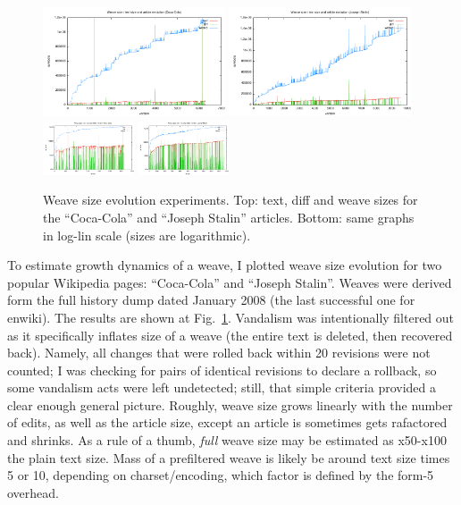 \documentclass{acm_proc_article-sp}
\begin{document}
\begin{figure} \label{fig:weave}
\includegraphics[width=0.48\textwidth]{cocacola-weave_vs_text-linscale.pdf}
\includegraphics[width=0.48\textwidth]{stalin-weave_vs_text-linscale.pdf}
\includegraphics[width=0.24\textwidth]{cocacola-weave_vs_text-logscale.pdf}
\includegraphics[width=0.24\textwidth]{stalin-weave_vs_text-logscale.pdf}
\caption{Weave size evolution experiments. Top: text, diff and weave sizes for the ``Coca-Cola'' and ``Joseph Stalin'' articles. Bottom: same graphs in log-lin scale (sizes are logarithmic).}
\end{figure}
To estimate growth dynamics of a weave, I plotted
weave size evolution for two popular Wikipedia pages: ``Coca-Cola''
and ``Joseph Stalin''. Weaves were derived form the full
history dump dated January 2008 (the last successful one
for enwiki). The results are shown at Fig.~\ref{fig:weave}.
Vandalism was intentionally filtered out as it specifically
inflates size of a weave (the entire text is deleted, then
recovered back). Namely, all changes that were rolled back
within 20 revisions were not counted; I was checking for
pairs of identical revisions to declare a rollback, so
some vandalism acts were left undetected; still, that simple
criteria provided a clear enough general picture.
Roughly, weave size grows linearly with the number of edits,
as well as the article size, except an article is sometimes
gets rafactored and shrinks. As a rule of a thumb, \emph{full} weave
size may be estimated as x50-x100 the plain text size.
Mass of a prefiltered weave is likely be around
text size times 5 or 10, depending on charset/encoding,
which factor is defined by the form-5 overhead.
\end{document}
